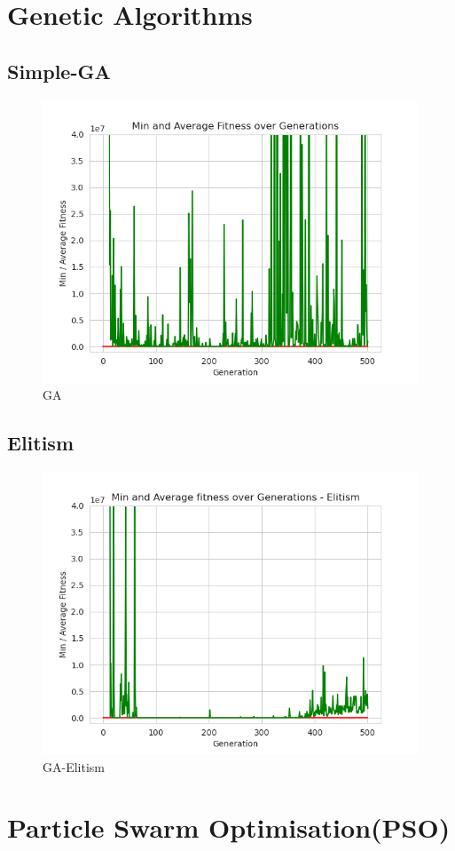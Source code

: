 \documentclass{report}
\begin{document}
\section{Genetic Algorithms}

\subsection{Simple-GA}

\begin{figure}[htp]
\centering
\includegraphics[scale=0.80]{Genetic/Simple.png}
\caption{GA}
\label{GA}
\end{figure}

\subsection{Elitism}
\begin{figure}[htp]
\centering
\includegraphics[scale=0.80]{Genetic/Elitism.png}
\caption{GA-Elitism}
\label{GA-Elitism}
\end{figure}

\section{Particle Swarm Optimisation(PSO)}




%
%

\end{document}
